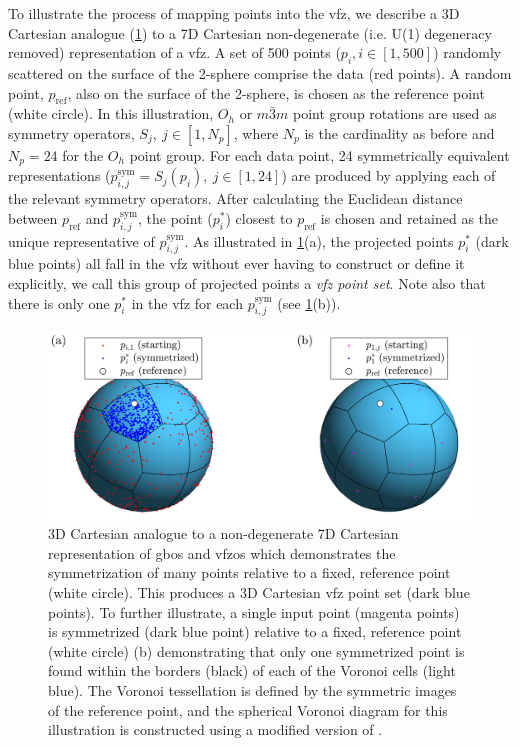 \documentclass[final,twocolumn,12pt]{elsarticle}
\newcommand{\startpt}{red points}
\newcommand{\singlept}{magenta points}
\newcommand{\sympt}{dark blue points}
\newcommand{\singlesympt}{dark blue point}
\newcommand{\refpt}{white circle}
\newcommand{\vbordercolor}{black}
\newcommand{\vcellcolor}{light blue}
\begin{document}
To illustrate the process of mapping points into the \gls{vfz}, we describe a 3D Cartesian analogue (\cref{fig:voronoi}) to a 7D Cartesian non-degenerate (i.e. U(1) degeneracy removed) representation of a \gls{vfz}. A set of \num{500} points ($p_i, i\in[1,500]$) randomly scattered on the surface of the 2-sphere comprise the data (\startpt{}). A random point, $p_{\text{ref}}$, also on the surface of the 2-sphere, is chosen as the reference point (\refpt{}). In this illustration, $O_h$ or $m\bar{3}m$ point group rotations are used as symmetry operators, $S_j,\ j\in[1,N_p]$, where $N_p$ is the cardinality as before and $N_p = 24$ for the $O_h$  point group. For each data point, \num{24} symmetrically equivalent representations ($p^{\text{sym}}_{i,j} = S_j(p_i),\ j\in[1,24]$) are produced by applying each of the relevant symmetry operators. After calculating the Euclidean distance between $p_{\text{ref}}$ and $p^{\text{sym}}_{i,j}$, the point ($p^{*}_i$) closest to $p_{\text{ref}}$ is chosen and retained as the unique representative of $p^{\text{sym}}_{i,j}$. As illustrated in \cref{fig:voronoi}(a), the projected points $p^{*}_i$ (dark blue points) all fall in the \gls{vfz} without ever having to construct or define it explicitly, we call this group of projected points a \textit{\gls{vfz} point set}. Note also that there is only one $p^{*}_i$ in the \gls{vfz} for each $p^{\text{sym}}_{i,j}$ (see \cref{fig:voronoi}(b)).

\begin{figure}
    \centering
    \includegraphics[scale=1]{voronoi.png}
    \caption{3D Cartesian analogue to a non-degenerate 7D Cartesian representation of \glspl{gbo} and \glspl{vfzo} which demonstrates the symmetrization of many points relative to a fixed, reference point (\refpt{}). This produces a 3D Cartesian \gls{vfz} point set (\sympt{}). To further illustrate, a single input point (\singlept{}) is symmetrized (\singlesympt{}) relative to a fixed, reference point (\refpt{}) (b) demonstrating that only one symmetrized point is found within the borders (\vbordercolor{}) of each of the Voronoi cells (\vcellcolor{}). The Voronoi tessellation is defined by the symmetric images of the reference point, and the spherical Voronoi diagram for this illustration is constructed using a modified version of \cite{luongVoronoiSphere2020}.}
    \label{fig:voronoi}
\end{figure}
\end{document}
